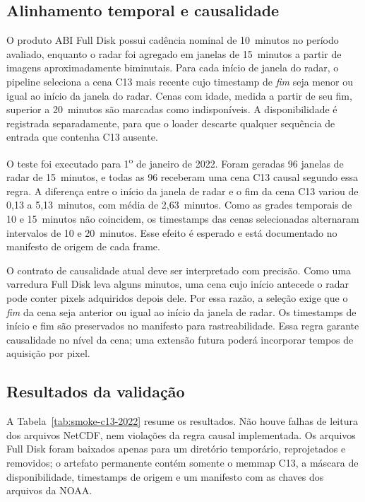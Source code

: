 \subsection{Alinhamento temporal e causalidade}
\label{subsec:smoke-c13-tempo}

O produto ABI Full Disk possui cadência nominal de 10~minutos no período avaliado, enquanto o radar foi agregado em janelas de 15~minutos a partir de imagens aproximadamente biminutais. Para cada início de janela do radar, o pipeline seleciona a cena C13 mais recente cujo timestamp de \emph{fim} seja menor ou igual ao início da janela do radar. Cenas com idade, medida a partir de seu fim, superior a 20~minutos são marcadas como indisponíveis. A disponibilidade é registrada separadamente, para que o loader descarte qualquer sequência de entrada que contenha C13 ausente.

O teste foi executado para 1\textsuperscript{o} de janeiro de 2022. Foram geradas 96 janelas de radar de 15~minutos, e todas as 96 receberam uma cena C13 causal segundo essa regra. A diferença entre o início da janela de radar e o fim da cena C13 variou de 0,13 a 5,13~minutos, com média de 2,63~minutos. Como as grades temporais de 10 e 15~minutos não coincidem, os timestamps das cenas selecionadas alternaram intervalos de 10 e 20~minutos. Esse efeito é esperado e está documentado no manifesto de origem de cada frame.

O contrato de causalidade atual deve ser interpretado com precisão. Como uma varredura Full Disk leva alguns minutos, uma cena cujo início antecede o radar pode conter pixels adquiridos depois dele. Por essa razão, a seleção exige que o \emph{fim} da cena seja anterior ou igual ao início da janela de radar. Os timestamps de início e fim são preservados no manifesto para rastreabilidade. Essa regra garante causalidade no nível da cena; uma extensão futura poderá incorporar tempos de aquisição por pixel.

\subsection{Resultados da validação}
\label{subsec:smoke-c13-resultados}

A Tabela~\ref{tab:smoke-c13-2022} resume os resultados. Não houve falhas de leitura dos arquivos NetCDF, nem violações da regra causal implementada. Os arquivos Full Disk foram baixados apenas para um diretório temporário, reprojetados e removidos; o artefato permanente contém somente o memmap C13, a máscara de disponibilidade, timestamps de origem e um manifesto com as chaves dos arquivos da NOAA.

